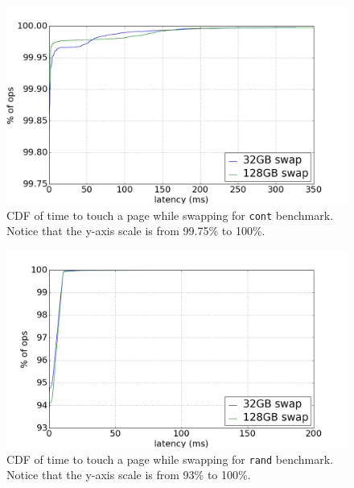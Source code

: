 \documentclass[twocolumn,11pt]{article}
\begin{document}
\begin{figure}[t]
    \includegraphics[width=\columnwidth]{figures/swap_touch_time_cont_cdf}
    \caption{CDF of time to touch a page while swapping for \texttt{cont}
    benchmark. Notice that the y-axis scale is from 99.75\% to 100\%.
    \label{fig:swap_time_cont_cdf}}
\end{figure}

\begin{figure}[t]
    \includegraphics[width=\columnwidth]{figures/swap_touch_time_rand_cdf}
    \caption{CDF of time to touch a page while swapping for \texttt{rand} benchmark.
    Notice that the y-axis scale is from 93\% to 100\%.\label{fig:swap_time_rand_cdf}}
\end{figure}

%
\end{document}
